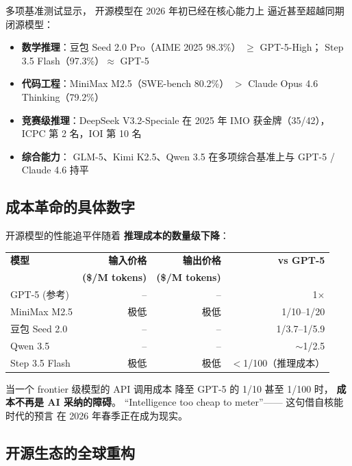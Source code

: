 多项基准测试显示，
开源模型在 2026 年初已经在核心能力上
逼近甚至超越同期闭源模型：

\begin{itemize}[noitemsep]
  \item \textbf{数学推理}：豆包 Seed 2.0 Pro（AIME 2025 98.3\%）
        $\geq$ GPT-5-High；
        Step 3.5 Flash（97.3\%）$\approx$ GPT-5
  \item \textbf{代码工程}：MiniMax M2.5（SWE-bench 80.2\%）
        $>$ Claude Opus 4.6 Thinking（79.2\%）
  \item \textbf{竞赛级推理}：DeepSeek V3.2-Speciale
        在 2025 年 IMO 获金牌（35/42），
        ICPC 第 2 名，IOI 第 10 名
  \item \textbf{综合能力}：
        GLM-5、Kimi K2.5、Qwen 3.5
        在多项综合基准上与 GPT-5 / Claude 4.6 持平
\end{itemize}

\subsection{成本革命的具体数字}

开源模型的性能追平伴随着
\textbf{推理成本的数量级下降}：

\begin{center}\small
\renewcommand{\arraystretch}{1.3}
\begin{tabular}{lrrr}
  \toprule
  \rowcolor{figLightGray}
  \textbf{模型} & \textbf{输入价格} & \textbf{输出价格} & \textbf{vs GPT-5} \\
  & \textbf{(\$/M tokens)} & \textbf{(\$/M tokens)} & \\
  \midrule
  GPT-5 (参考) & -- & -- & 1$\times$ \\
  MiniMax M2.5 & 极低 & 极低 & 1/10--1/20 \\
  豆包 Seed 2.0 & -- & -- & 1/3.7--1/5.9 \\
  Qwen 3.5 & -- & -- & $\sim$1/2.5 \\
  Step 3.5 Flash & 极低 & 极低 & $<$1/100（推理成本） \\
  \bottomrule
\end{tabular}
\end{center}

当一个 frontier 级模型的 API 调用成本
降至 GPT-5 的 1/10 甚至 1/100 时，
\textbf{成本不再是 AI 采纳的障碍}。
“Intelligence too cheap to meter”——
这句借自核能时代的预言
在 2026 年春季正在成为现实。

\subsection{开源生态的全球重构}


